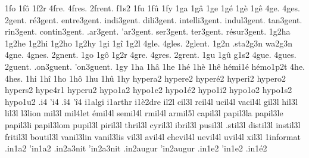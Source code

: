 {1fo
1f\^o
1f2r
4fre.
4fres.
2frent. %
f1s2
1fu
1f\^u
1fy
1ga
1g\^a
1ge
1g\'e
1g\`e
1g\^e
4ge.
4ges.
       2gent.
   r\'e3gent.
  entre3gent.
   indi3gent.
   dili3gent.
intelli3gent.
  indul3gent.
    tan3gent.
    rin3gent.
 contin3gent.
    .ar3gent.
    'ar3gent.
    ser3gent.
    ter3gent.
r\'esur3gent.
%
1g2ha
1g2he
1g2hi
1g2ho
1g2hy
1gi
1g\^i
1g2l
4gle.
4gles.
2glent. %
    1g2n
.sta2g3n
  wa2g3n
4gne.
4gnes.
2gnent. %
1go
1g\^o
1g2r
4gre.
4gres.
2grent. %
1gu
1g\^u
g1s2
4gue.
4gues.
   2guent.
.on3guent.
'on3guent.
%
1gy
1ha
1h\^a
1he
1h\'e
1h\`e
1h\^e
                    h\'emi1\'e
                    h\'emo1p2t
4he.
4hes.
1hi
1h\^i
1ho
1h\^o
1hu
1h\^u
1hy
                    hypera2
                    hypere2
                    hyper\'e2
                    hyperi2
                    hypero2
                    hypers2
                    hype4r1
                    hyperu2
                    hypo1a2
                    hypo1e2 %
                    hypo1\'e2
                    hypo1i2
                    hypo1o2
                    hypo1s2
                    hypo1u2
.i4
'i4
.\^i4
'\^i4
                    i1algi
                    i1arthr
                    i1\`e2dre
    il2l 
   cil3l
  rcil4l
  ucil4l
 vacil4l
   gil3l
   hil3l
   lil3l
     l3lion
   mil3l
   mil4let
\'emil4l
 semil4l
  rmil4l
 armil5l
 capil3l
 papil3la
 papil3le
 papil3li
 papil3lom
 pupil3l
 piril3l
 thril3l
 cyril3l
 ibril3l
 pusil3l
 .stil3l
distil3l
instil3l
fritil3l
boutil3l
 vanil3lin
 vanil3lis
   vil3l
  avil4l
chevil4l
 uevil4l
  uvil4l
   xil3l
                    1informat %
                    .in1a2
                    'in1a2
                    .in2a3nit
                    'in2a3nit
                    .in2augur
                    'in2augur
                    .in1e2
                    'in1e2
                    .in1\'e2
}

